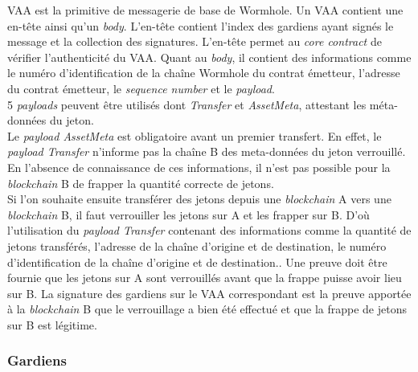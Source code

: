 VAA \cite{wormholeVAA} est la primitive de messagerie de base de Wormhole. Un VAA contient une en-tête 
ainsi qu'un \textit{body}. L'en-tête contient l'index des gardiens ayant signés le message et la collection des signatures.
L'en-tête permet au \textit{core contract} de vérifier l'authenticité du VAA.
Quant au \textit{body}, il contient des informations comme le numéro d'identification de la chaîne 
Wormhole du contrat émetteur, l'adresse du contrat émetteur, le \textit{sequence number} 
et le \textit{payload}.\\ 5 \textit{payloads} peuvent être utilisés dont \textit{Transfer} et 
\textit{AssetMeta}, attestant les méta-données du jeton.\\
Le \textit{payload AssetMeta} est obligatoire avant un premier transfert.
En effet, le \textit{payload Transfer} n'informe pas la chaîne B des meta-données du jeton verrouillé.
En l'absence de connaissance de ces informations, il n'est pas possible pour la \textit{\gls{blockchain}} B 
de frapper la quantité correcte de jetons.\\
Si l'on souhaite ensuite transférer des jetons depuis une \textit{\gls{blockchain}} A vers une 
\textit{\gls{blockchain}} B, il faut verrouiller les jetons sur A et les frapper sur B.
D'où l'utilisation du \textit{payload Transfer} contenant des informations comme la 
quantité de jetons transférés, l'adresse de la chaîne d'origine et de destination, 
le numéro d'identification de la chaîne d'origine et de destination..
Une preuve doit être fournie que les jetons sur A sont verrouillés avant que la frappe puisse 
avoir lieu sur B. La signature des gardiens sur le VAA correspondant est la preuve apportée à 
la \textit{\gls{blockchain}} B que le verrouillage a bien été effectué et que la frappe de jetons sur 
B est légitime.

\subsubsection{Gardiens}

